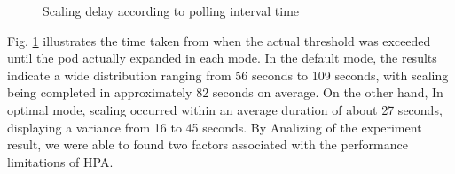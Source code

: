\documentclass[conference]{IEEEtran}
\begin{document}
\begin{figure}[ht!]
    \caption{Scaling delay according to polling interval time}
    \label{fig:scaling time}
\end{figure}

Fig. \ref{fig:scaling time} illustrates the time taken from when the actual threshold was exceeded until the pod actually expanded in each mode. In the default mode, the results indicate a wide distribution ranging from 56 seconds to 109 seconds, with scaling being completed in approximately 82 seconds on average. On the other hand, In optimal mode, scaling occurred within an average duration of about 27 seconds, displaying a variance from 16 to 45 seconds. By Analizing of the experiment result, we were able to found two factors associated with the performance limitations of HPA.
\end{document}
